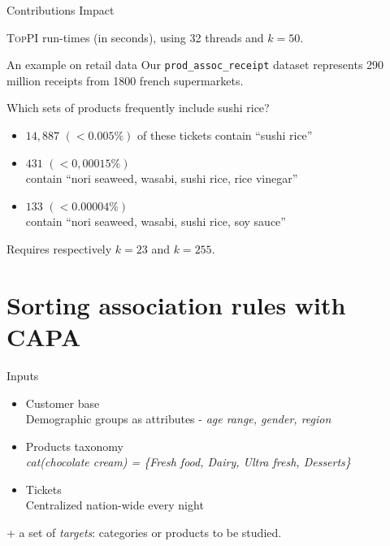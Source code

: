 \documentclass[table]{beamer}
\providecommand{\toppi}{\mbox{\textsc{TopPI}} }
\providecommand{\capa}{\mbox{\textsc{CAPA}} }
\providecommand{\prodassocreceipt}{\texttt{prod\-\_assoc\-\_receipt} }
\begin{document}
\begin{frame}{Contributions Impact}
{  \vspace{1em}
	\toppi run-times (in seconds), using 32 threads and $k=50$.

  \vspace{1em}


  }
\end{frame}

\begin{frame}{An example on retail data}
  Our \prodassocreceipt dataset represents 290 million receipts from 1800 french supermarkets.

  \vspace{1em}
  Which sets of products frequently include sushi rice?
  \pause
  \begin{itemize}
    \item $14,887$ $(< 0.005\%)$ of these tickets contain ``sushi rice''
    \pause
    \item $431$ $(< 0,00015 \%)$ \\ contain ``nori seaweed, wasabi, sushi rice, rice vinegar''
    \pause
    \item $133$ $(< 0.00004\%)$ \\ contain ``nori seaweed, wasabi, sushi rice, soy sauce''
  \end{itemize}
  \pause
  Requires respectively $k = 23$ and $k=255$.
\end{frame}





\section{Sorting association rules with \capa}

\begin{frame}{Inputs}
\begin{itemize}
  \item Customer base\\
  Demographic groups as attributes - {\em age range, gender, region}
  \item Products taxonomy\\
  {\em cat(chocolate cream) = \{Fresh food, Dairy, Ultra fresh, Desserts\}}
  \item Tickets\\
  Centralized nation-wide every night
\end{itemize}
+ a set of {\em targets}: categories or products to be studied.
\end{frame}
\end{document}
